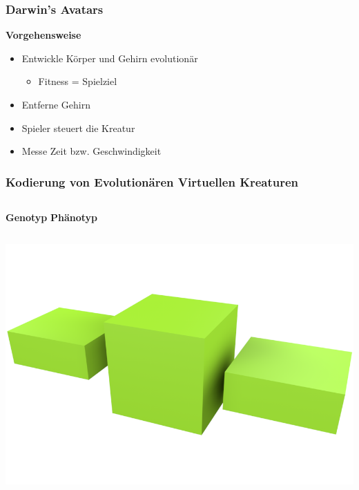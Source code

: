 \documentclass{beamer}
\begin{document}
\begin{frame}
	\frametitle{Darwin's Avatars}
	\textbf{Vorgehensweise}\\ \pause
	\begin{itemize}
		\item Entwickle Körper und Gehirn evolutionär \pause
		\begin{itemize}
			\item Fitness = Spielziel \pause
		\end{itemize} 
		\item Entferne Gehirn \pause
		\item Spieler steuert die Kreatur \pause
		\item Messe Zeit bzw. Geschwindigkeit
	\end{itemize}	
\end{frame}

\begin{frame}[t]
	\frametitle{Kodierung von Evolutionären Virtuellen Kreaturen}
	\begin{columns}[c]
		\centering
		\textbf{Genotyp}
		\centering
		\textbf{Phänotyp}
	\end{columns}
	\begin{columns}[c]
		\centering
		\pause
		\centering
		\includegraphics[width=\textwidth]{img/1.png}
		\column{0cm}
		\vspace{7.5cm}
	\end{columns}
\end{frame}
\end{document}
